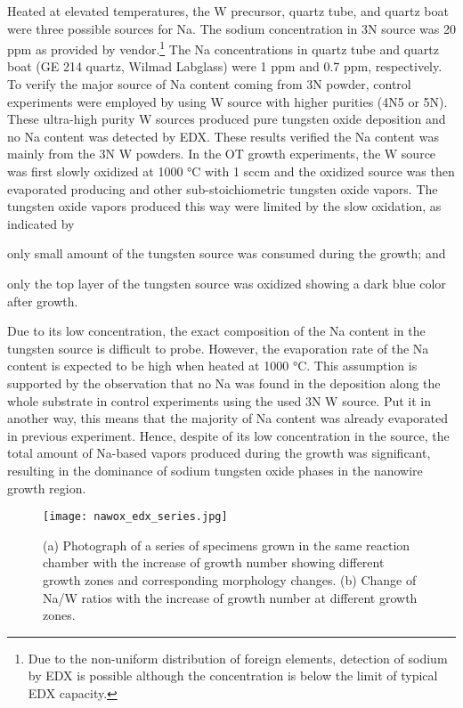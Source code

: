 Heated at elevated temperatures, the W precursor, quartz tube, and quartz boat were three possible sources for Na. The sodium concentration in 3N source was 20 ppm as provided by vendor.\footnote{Due to the non-uniform distribution of foreign elements, detection of sodium by EDX is possible although the concentration is below the limit of typical EDX capacity.} The Na concentrations in quartz tube and quartz boat (GE 214 quartz, Wilmad Labglass) were 1 ppm and 0.7 ppm, respectively. To verify the major source of Na content coming from 3N powder, control experiments were employed by using W source with higher purities (4N5 or 5N). These ultra-high purity W sources produced pure tungsten oxide deposition and no Na content was detected by EDX. These results verified the Na content was mainly from the 3N W powders. In the OT growth experiments, the W source was first slowly oxidized at 1000 \si{\degreeCelsius} with 1 sccm  and the oxidized source was then evaporated producing  and other sub-stoichiometric tungsten oxide vapors. The tungsten oxide vapors produced this way were limited by the slow oxidation, as indicated by
\begin{enumerate*}[label=\itshape\alph*\upshape)]
\item only small amount of the tungsten source was consumed during the growth; and
\item only the top layer of the tungsten source was oxidized showing a dark blue color after growth.
\end{enumerate*} Due to its low concentration, the exact composition of the Na content in the tungsten source is difficult to probe. However, the evaporation rate of the Na content is expected to be high when heated at 1000 \si{\degreeCelsius}. This assumption is supported by the observation that no Na was found in the deposition along the whole substrate in control experiments using the used 3N W source. Put it in another way, this means that the majority of Na content was already evaporated in previous experiment. Hence, despite of its low concentration in the source, the total amount of Na-based vapors produced during the growth was significant, resulting in the dominance of sodium tungsten oxide phases in the nanowire growth region.

\begin{figure}[htb]
\centering
\texttt{[image: nawox\_edx\_series.jpg]}
\caption[Photograph of a series of specimens grown]{(a) Photograph of a series of specimens grown in the same reaction chamber with the increase of growth number showing different growth zones and corresponding morphology changes. (b) Change of Na/W ratios with the increase of growth number at different growth zones.}
\label{fig:nawoxser}
\end{figure}

